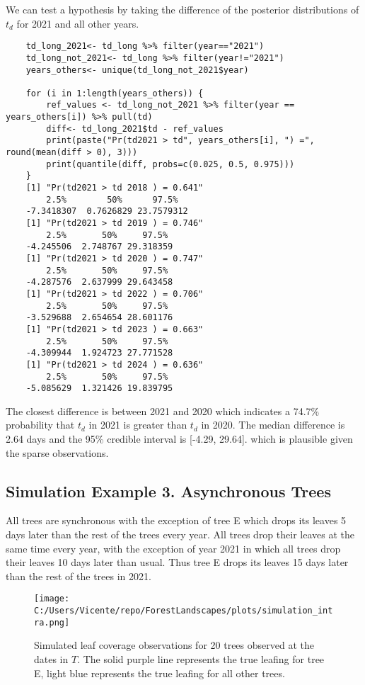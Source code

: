 \documentclass{article}
\begin{document}
We can test a hypothesis by taking the difference of the posterior distributions of $t_d$ for 2021 and all other years.
\begin{verbatim}
    td_long_2021<- td_long %>% filter(year=="2021")
    td_long_not_2021<- td_long %>% filter(year!="2021")
    years_others<- unique(td_long_not_2021$year)

    for (i in 1:length(years_others)) {
        ref_values <- td_long_not_2021 %>% filter(year == years_others[i]) %>% pull(td)
        diff<- td_long_2021$td - ref_values
        print(paste("Pr(td2021 > td", years_others[i], ") =", round(mean(diff > 0), 3)))
        print(quantile(diff, probs=c(0.025, 0.5, 0.975)))
    }
    [1] "Pr(td2021 > td 2018 ) = 0.641"
        2.5%        50%      97.5%
    -7.3418307  0.7626829 23.7579312
    [1] "Pr(td2021 > td 2019 ) = 0.746"
        2.5%       50%     97.5%
    -4.245506  2.748767 29.318359
    [1] "Pr(td2021 > td 2020 ) = 0.747"
        2.5%       50%     97.5%
    -4.287576  2.637999 29.643458
    [1] "Pr(td2021 > td 2022 ) = 0.706"
        2.5%       50%     97.5%
    -3.529688  2.654654 28.601176
    [1] "Pr(td2021 > td 2023 ) = 0.663"
        2.5%       50%     97.5%
    -4.309944  1.924723 27.771528
    [1] "Pr(td2021 > td 2024 ) = 0.636"
        2.5%       50%     97.5%
    -5.085629  1.321426 19.839795
\end{verbatim}

The closest difference is between 2021 and 2020 which indicates a 74.7\% probability that $t_d$ in 2021 is greater than $t_d$ in 2020. 
The median difference is 2.64 days and the 95\% credible interval is [-4.29, 29.64]. which is plausible given the sparse observations.

\subsection{Simulation Example 3. Asynchronous Trees}

All trees are synchronous with the exception of tree E which drops its leaves 5 days later than the rest of the trees every year.
All trees drop their leaves at the same time every year, with the exception of year 2021 in which all trees drop their leaves 10 days later than usual.
Thus tree E drops its leaves 15 days later than the rest of the trees in 2021.

\begin{figure}
    \centering
    \texttt{[image: C:/Users/Vicente/repo/ForestLandscapes/plots/simulation\_intra.png]}
    \caption{Simulated leaf coverage observations for 20 trees observed at the dates in $T$. The solid purple line represents the true leafing for tree E, light blue represents the true leafing for all other trees.}
    \label{fig:interpolation_problem_asynchronous_trees}
\end{figure}
\end{document}
